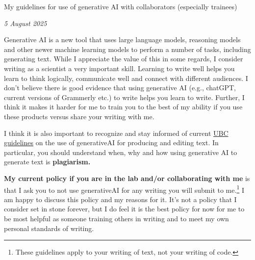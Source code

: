 \documentclass[11pt]{article}
\begin{document}

\renewcommand{\refname}{\CHead{}}


{\Large My guidelines for use of generative AI with collaborators (especially trainees)}

\emph{5 August 2025}

Generative AI is a new tool that uses large language models, reasoning models and other newer machine learning models to perform a number of tasks, including generating text. While I appreciate the value of this in some regards, I consider writing as a scientist a very important skill. Learning to write well helps you learn to think logically, communicate well and connect with different audiences. I don't believe there is good evidence that using generative AI (e.g., chatGPT, current versions of Grammerly etc.) to write helps you learn to write. Further, I think it makes it harder for me to train you to the best of my ability if you use these products versus share your writing with me. 

I think it is also important to recognize and stay informed of current \href{http://grad.ubc.ca/current-students/student-responsibilities/use-generative-ai}{UBC guidelines} on the use of generativeAI for producing and editing text. In particular, you should understand when, why and how using generative AI to generate text is {\bf plagiarism.}

{\bf My current policy if you are in the lab and/or collaborating with me} is that I ask you to not use generativeAI for any writing you will submit to me.\footnote{These guidelines apply to your writing of text, not your writing of code.}  I am happy to discuss this policy and my reasons for it. It's not a policy that I consider set in stone forever, but I do feel it is the best policy for now for me to be most helpful as someone training others in writing and to meet my own personal standards of writing. 
\end{document}
